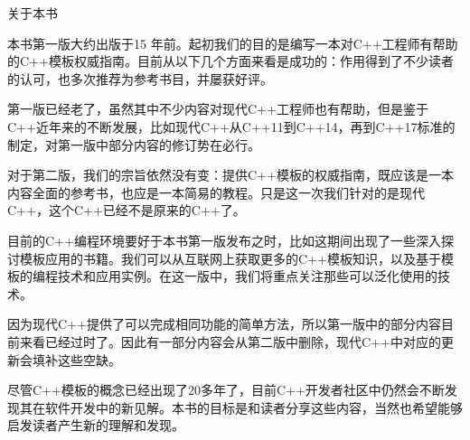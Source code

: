 \begin{flushright}
 关于本书
\end{flushright}

本书第一版大约出版于15 年前。起初我们的目的是编写一本对C++工程师有帮助的C++模板权威指南。目前从以下几个方面来看是成功的：作用得到了不少读者的认可，也多次推荐为参考书目，并屡获好评。

第一版已经老了，虽然其中不少内容对现代C++工程师也有帮助，但是鉴于C++近年来的不断发展，比如现代C++从C++11到C++14，再到C++17标准的制定，对第一版中部分内容的修订势在必行。

对于第二版，我们的宗旨依然没有变：提供C++模板的权威指南，既应该是一本内容全面的参考书，也应是一本简易的教程。只是这一次我们针对的是现代C++，这个C++已经不是原来的C++了。

目前的C++编程环境要好于本书第一版发布之时，比如这期间出现了一些深入探讨模板应用的书籍。我们可以从互联网上获取更多的C++模板知识，以及基于模板的编程技术和应用实例。在这一版中，我们将重点关注那些可以泛化使用的技术。

因为现代C++提供了可以完成相同功能的简单方法，所以第一版中的部分内容目前来看已经过时了。因此有一部分内容会从第二版中删除，现代C++中对应的更新会填补这些空缺。

尽管C++模板的概念已经出现了20多年了，目前C++开发者社区中仍然会不断发现其在软件开发中的新见解。本书的目标是和读者分享这些内容，当然也希望能够启发读者产生新的理解和发现。